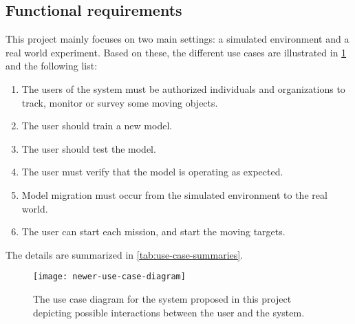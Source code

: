 \documentclass[../main.tex]{subfiles}
\begin{document}
\subsection{Functional requirements}

This project mainly focuses on two main settings: a simulated
environment and a real world experiment. 
Based on these, the different use cases are illustrated in
\cref{fig:use-case-diagram} and the following list:

\begin{enumerate}
    \item The users of the system must be authorized individuals and
        organizations to track, monitor or survey some moving objects.
    \item The user should train a new model.
    \item The user should test the model.
    \item The user must verify that the model is operating as expected.
    \item Model migration must occur from the simulated environment to the 
    real world.
    \item The user can start each mission, and start the moving targets.
\end{enumerate}

\noindent The details are summarized in \cref{tab:use-case-summaries}.

\begin{figure}[tbp] 
    \centering
    \texttt{[image: newer-use-case-diagram]} 
    \caption{The use case diagram for the system proposed 
            in this project depicting possible interactions 
            between the user and the system.}
    \label{fig:use-case-diagram} 
\end{figure}
\end{document}
